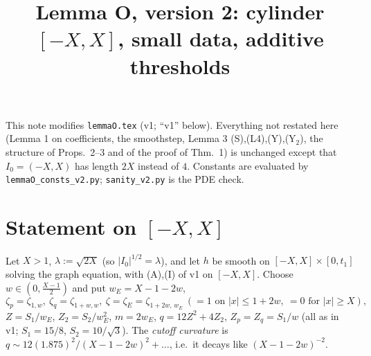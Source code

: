 \documentclass[11pt]{article}
\title{Lemma O, version 2: cylinder $[-X,X]$, small data, additive thresholds}\author{}\date{}
\theoremstyle{remark}\newtheorem{remark}[theorem]{Remark}
\begin{document}
\maketitle
This note modifies \texttt{lemmaO.tex} (v1; ``v1'' below). Everything not restated here (Lemma 1 on coefficients, the smoothstep, Lemma 3 (S),(L4),(Y),(Y$_2$), the structure of Props.\ 2--3 and of the proof of Thm.\ 1) is unchanged except that $I_0=(-X,X)$ has length $2X$ instead of $4$. Constants are evaluated by \texttt{lemmaO\_consts\_v2.py}; \texttt{sanity\_v2.py} is the PDE check.

\section{Statement on $[-X,X]$}
Let $X>1$, $\lambda:=\sqrt{2X}$ (so $|I_0|^{1/2}=\lambda$), and let $h$ be smooth on $[-X,X]\times[0,t_1]$ solving the graph equation, with (A),(I) of v1 on $[-X,X]$. Choose $w\in(0,\frac{X-1}{2})$ and put $w_E=X-1-2w$,
\[
\zeta_p=\zeta_{1,w},\ \zeta_q=\zeta_{1+w,w},\ \zeta=\zeta_E=\zeta_{1+2w,\,w_E}\ (=1\text{ on }|x|\le1+2w,\ =0\text{ for }|x|\ge X),
\]
$Z=S_1/w_E$, $Z_2=S_2/w_E^2$, $m=2w_E$, $q=12Z^2+4Z_2$, $Z_p=Z_q=S_1/w$ (all as in v1; $S_1=15/8$, $S_2=10/\sqrt3$). The \emph{cutoff curvature} is $q\sim 12(1.875)^2/(X-1-2w)^2+\dots$, i.e.\ it decays like $(X-1-2w)^{-2}$.
\end{document}
